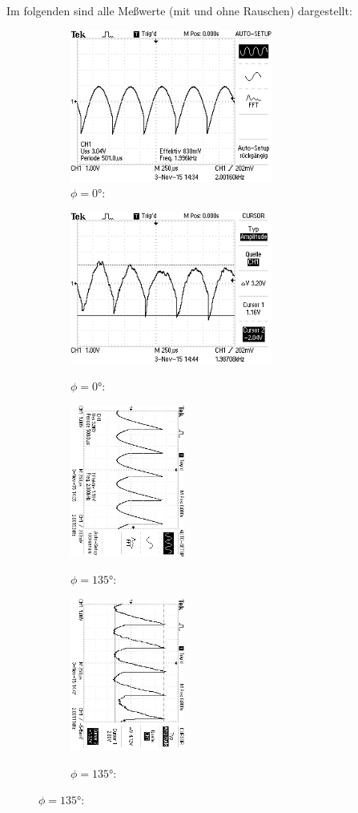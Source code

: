 Im folgenden sind alle Meßwerte (mit und ohne Rauschen) dargestellt:
\begin{figure}
\caption{$U_{out}$ (links ohne, rechts mit Rauschen)}
\centering
\begin{subfigure}{0.48\textwidth}
\centering
\caption{$\phi=0°$:}
\includegraphics[angle=90,height=5cm]{graphics/ALL0031/F0031TEK.jpg}

\label{fig:phi0o}
\end{subfigure}
\begin{subfigure}{0.48\textwidth}
\centering
\caption{$\phi=0°$:}
\includegraphics[angle=90,height=5cm]{graphics/ALL0039/F0039TEK.jpg}
\label{fig:phi0m}
\end{subfigure}

\begin{subfigure}{0.48\textwidth}
\centering
\caption{$\phi=135°$:}
\includegraphics[angle=90,height=5cm]{graphics/ALL0032/F0032TEK.jpg}
\label{fig:phi135o}
\end{subfigure}
\begin{subfigure}{0.48\textwidth}
\centering
\caption{$\phi=135°$:}
\includegraphics[angle=90,height=5cm]{graphics/ALL0040/F0040TEK.jpg}
\label{fig:phi135m}
\end{subfigure}


\end{figure}
